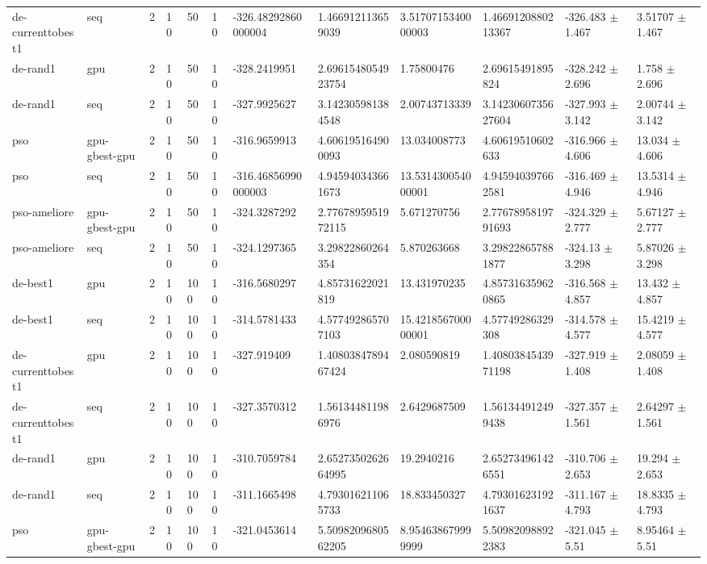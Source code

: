 \begin{table}[t]
\begin{tabular}{llllllllllll}
de-currenttobest1 & seq & 2 & 10 & 50 & 10 & -326.48292860000004 & 1.466912113659039 & 3.5170715340000003 & 1.4669120880213367 & -326.483 $\pm$ 1.467 & 3.51707 $\pm$ 1.467 \\
de-rand1 & gpu & 2 & 10 & 50 & 10 & -328.2419951 & 2.6961548054923754 & 1.75800476 & 2.69615491895824 & -328.242 $\pm$ 2.696 & 1.758 $\pm$ 2.696 \\
de-rand1 & seq & 2 & 10 & 50 & 10 & -327.9925627 & 3.142305981384548 & 2.00743713339 & 3.1423060735627604 & -327.993 $\pm$ 3.142 & 2.00744 $\pm$ 3.142 \\
pso & gpu-gbest-gpu & 2 & 10 & 50 & 10 & -316.9659913 & 4.606195164900093 & 13.034008773 & 4.60619510602633 & -316.966 $\pm$ 4.606 & 13.034 $\pm$ 4.606 \\
pso & seq & 2 & 10 & 50 & 10 & -316.46856990000003 & 4.945940343661673 & 13.531430054000001 & 4.945940397662581 & -316.469 $\pm$ 4.946 & 13.5314 $\pm$ 4.946 \\
pso-ameliore & gpu-gbest-gpu & 2 & 10 & 50 & 10 & -324.3287292 & 2.7767895951972115 & 5.671270756 & 2.7767895819791693 & -324.329 $\pm$ 2.777 & 5.67127 $\pm$ 2.777 \\
pso-ameliore & seq & 2 & 10 & 50 & 10 & -324.1297365 & 3.29822860264354 & 5.870263668 & 3.298228657881877 & -324.13 $\pm$ 3.298 & 5.87026 $\pm$ 3.298 \\
de-best1 & gpu & 2 & 10 & 100 & 10 & -316.5680297 & 4.85731622021819 & 13.431970235 & 4.857316359620865 & -316.568 $\pm$ 4.857 & 13.432 $\pm$ 4.857 \\
de-best1 & seq & 2 & 10 & 100 & 10 & -314.5781433 & 4.577492865707103 & 15.421856700000001 & 4.57749286329308 & -314.578 $\pm$ 4.577 & 15.4219 $\pm$ 4.577 \\
de-currenttobest1 & gpu & 2 & 10 & 100 & 10 & -327.919409 & 1.4080384789467424 & 2.080590819 & 1.4080384543971198 & -327.919 $\pm$ 1.408 & 2.08059 $\pm$ 1.408 \\
de-currenttobest1 & seq & 2 & 10 & 100 & 10 & -327.3570312 & 1.561344811986976 & 2.6429687509 & 1.561344912499438 & -327.357 $\pm$ 1.561 & 2.64297 $\pm$ 1.561 \\
de-rand1 & gpu & 2 & 10 & 100 & 10 & -310.7059784 & 2.6527350262664995 & 19.2940216 & 2.652734961426551 & -310.706 $\pm$ 2.653 & 19.294 $\pm$ 2.653 \\
de-rand1 & seq & 2 & 10 & 100 & 10 & -311.1665498 & 4.793016211065733 & 18.833450327 & 4.793016231921637 & -311.167 $\pm$ 4.793 & 18.8335 $\pm$ 4.793 \\
pso & gpu-gbest-gpu & 2 & 10 & 100 & 10 & -321.0453614 & 5.5098209680562205 & 8.954638679999999 & 5.509820988922383 & -321.045 $\pm$ 5.51 & 8.95464 $\pm$ 5.51 \\

\end{tabular}
\end{table}
